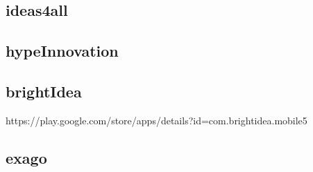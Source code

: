 \subsection{ideas4all}
\subsection{hypeInnovation}
\subsection{brightIdea}
https://play.google.com/store/apps/details?id=com.brightidea.mobile5
\subsection{exago}

